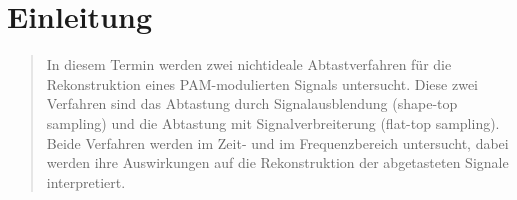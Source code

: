 \section{Einleitung}
\begin{quote}
	In diesem Termin werden zwei nichtideale Abtastverfahren für die
	Rekonstruktion eines PAM-modulierten Signals untersucht. Diese zwei Verfahren
	sind das Abtastung durch Signalausblendung (shape-top sampling) und die
	Abtastung mit Signalverbreiterung (flat-top sampling). Beide Verfahren werden
	im Zeit- und im Frequenzbereich untersucht, dabei werden ihre Auswirkungen auf
	die Rekonstruktion der abgetasteten Signale interpretiert.
\end{quote}%


